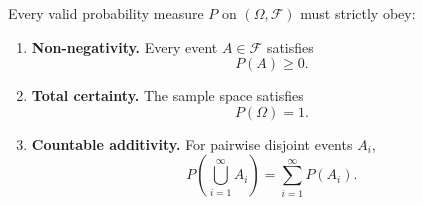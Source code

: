 \documentclass[12pt,a4paper]{article}
\begin{document}
\begin{tcolorbox}[formulabox, title={\textbf{Kolmogorov's Axioms of Probability}}]
Every valid probability measure $P$ on $(\Omega, \mathcal{F})$ must strictly obey:
\begin{enumerate}[leftmargin=*, itemsep=4pt]
  \item \textbf{Non-negativity.} Every event $A \in \mathcal{F}$ satisfies
  \begin{equation}
    P(A) \ge 0.
  \end{equation}
  \item \textbf{Total certainty.} The sample space satisfies
  \begin{equation}
    P(\Omega) = 1.
  \end{equation}
  \item \textbf{Countable additivity.} For pairwise disjoint events $A_i$,
  \begin{equation}
    P\left(\bigcup_{i=1}^{\infty} A_i\right) = \sum_{i=1}^{\infty} P(A_i).
  \end{equation}
\end{enumerate}
\end{tcolorbox}
\end{document}
